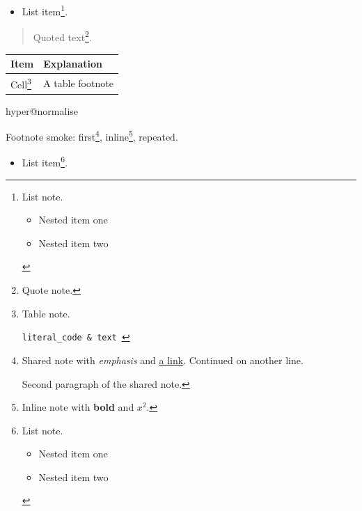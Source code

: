 \begin{itemize}
\item List item\footnote{\label{mark2tex:footnote:9a73ec147020e5f3f162908b134a7721:2}List note.

\begin{itemize}
\item Nested item one
\item Nested item two
\end{itemize}}.
\end{itemize}

\begin{quote}
Quoted text\footnote{Quote note.}.
\end{quote}

\par\addvspace{\medskipamount}
\noindent\begin{tabularx}{\linewidth}{@{}>{\raggedright\arraybackslash}X>{\raggedright\arraybackslash}X@{}}
\toprule
Item & Explanation \\
\midrule
Cell\footnote{\label{mark2tex:footnote:9a73ec147020e5f3f162908b134a7721:3}Table note.

\texttt{literal\_code \& text
}} & A table footnote \\
\bottomrule
\end{tabularx}
\par\addvspace{\medskipamount}




\ifcsname hyper@normalise\endcsname\else\PackageError{mark2tex}{Markdown links require hyperref}{Load \string\usepackage{hyperref} in the document preamble.}\fi
Footnote smoke: first\footnote{\label{mark2tex:footnote:9a73ec147020e5f3f162908b134a7721:1}Shared note with \emph{emphasis} and \href{\detokenize{https://example.org/footnote}}{a link}.
Continued on another line.

Second paragraph of the shared note.}, inline\footnote{Inline note with \textbf{bold} and $x^2$.}, repeated.

\begin{itemize}
\item List item\footnote{\label{mark2tex:footnote:9a73ec147020e5f3f162908b134a7721:2}List note.

\begin{itemize}
\item Nested item one
\item Nested item two
\end{itemize}}.
\end{itemize}

